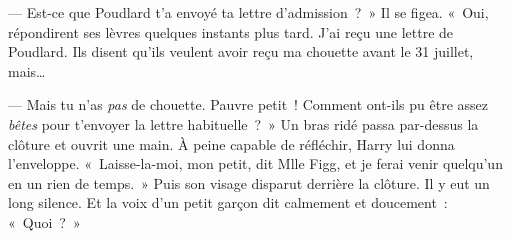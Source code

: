 --- Est-ce que Poudlard t'a envoyé ta lettre d'admission~?~»
Il se figea.
«~Oui, répondirent ses lèvres quelques instants plus tard. J'ai reçu une lettre de Poudlard. Ils disent qu'ils veulent avoir reçu ma chouette avant le 31 juillet, mais…

--- Mais tu n'as \emph{pas} de chouette. Pauvre petit~! Comment ont-ils pu être assez \emph{bêtes} pour t'envoyer la lettre habituelle~?~»
Un bras ridé passa par-dessus la clôture et ouvrit une main. À peine capable de réfléchir, Harry lui donna l'enveloppe.
«~Laisse-la-moi, mon petit, dit Mlle Figg, et je ferai venir quelqu'un en un rien de temps.~»
Puis son visage disparut derrière la clôture.
Il y eut un long silence.
Et la voix d'un petit garçon dit calmement et doucement~: «~Quoi~?~»
